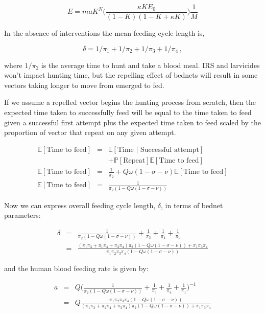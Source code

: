 \begin{equation}
E = maK^N\bigg(\frac{\kappa KE_0}{(1-K)(1-K+\kappa K)}\bigg)\frac{1}{M}
\end{equation}

In the absence of interventions the mean feeding cycle length is,

\begin{equation}
\delta = 1/\pi_1+1/\pi_2+1/\pi_3+1/\pi_4\,,
\end{equation}

where $1/\pi_2$ is the average time to hunt and take a blood meal. IRS and larvicides won't impact hunting time, but the repelling effect of bednets will result in some vectors taking longer to move from emerged to fed.

If we assume a repelled vector begins the hunting process from scratch, then the expected time taken to successfully feed will be equal to the time taken to feed given a successful first attempt plus the expected time taken to feed scaled by the proportion of vector that repeat on any given attempt.

\begin{eqnarray}
\mathbb{E}[\mbox{Time to feed}] &=& \mathbb{E}[\mbox{Time }|\mbox{ Successful attempt}] \\
&& + \mathbb{P}[\mbox{Repeat}]\mathbb{E}[\mbox{Time to feed}]\\
\mathbb{E}[\mbox{Time to feed}] &=& \frac{1}{\pi_2} + Q\omega(1-\sigma-\nu)\mathbb{E}[\mbox{Time to feed}]\\
\mathbb{E}[\mbox{Time to feed}] &=& \frac{1}{\pi_2(1-Q\omega(1-\sigma-\nu))}
\end{eqnarray}

Now we can express overall feeding cycle length, $\delta$, in terms of bednet parameters:

\begin{eqnarray}
\delta &=& \frac{1}{\pi_2(1-Q\omega(1-\sigma-\nu))} + \frac{1}{\pi_3}+\frac{1}{\pi_4}+\frac{1}{\pi_1}\\
&=& \frac{(\pi_1\pi_3+\pi_1\pi_4+\pi_3\pi_4)\pi_2(1-Q\omega(1-\sigma-\nu))+\pi_1\pi_3\pi_4}{\pi_1\pi_2\pi_3\pi_4(1-Q\omega(1-\sigma-\nu))}
\end{eqnarray}

and the human blood feeding rate is given by:

\begin{eqnarray}
a &=& Q\bigg(\frac{1}{\pi_2(1-Q\omega(1-\sigma-\nu))} + \frac{1}{\pi_3}+\frac{1}{\pi_4}+\frac{1}{\pi_1}\bigg)^{-1}\\
&=& Q\frac{\pi_1\pi_2\pi_3\pi_4(1-Q\omega(1-\sigma-\nu))}{(\pi_1\pi_3+\pi_1\pi_4+\pi_3\pi_4)\pi_2(1-Q\omega(1-\sigma-\nu))+\pi_1\pi_3\pi_4}
\end{eqnarray}

